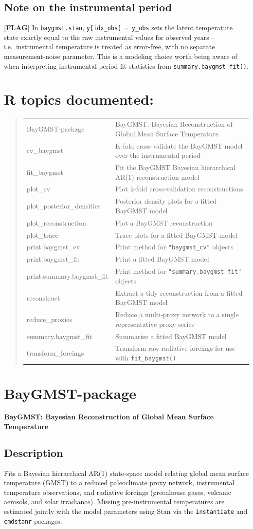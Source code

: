 \documentclass[10pt]{article}
\newcommand{\flag}[1]{\textcolor{gaporange}{\textbf{[FLAG]} #1}}
\newcommand{\rdtopic}[1]{\clearpage\section{#1}}
\newcommand{\rdsub}[1]{\subsection*{#1}}
\begin{document}
\rdsub{Note on the instrumental period}
\flag{In \texttt{baygmst.stan}, \texttt{y[idx\_obs] = y\_obs} sets the
latent temperature state exactly equal to the raw instrumental values for
observed years -- i.e.\ instrumental temperature is treated as error-free,
with no separate measurement-noise parameter. This is a modeling choice
worth being aware of when interpreting instrumental-period fit statistics
from \texttt{summary.baygmst\_fit()}.}

\rdtopic{R topics documented:}
\begin{quote}
\begin{tabular}{ll}
BayGMST-package & BayGMST: Bayesian Reconstruction of Global Mean Surface Temperature \\
cv\_baygmst & K-fold cross-validate the BayGMST model over the instrumental period \\
fit\_baygmst & Fit the BayGMST Bayesian hierarchical AR(1) reconstruction model \\
plot\_cv & Plot k-fold cross-validation reconstructions \\
plot\_posterior\_densities & Posterior density plots for a fitted BayGMST model \\
plot\_reconstruction & Plot a BayGMST reconstruction \\
plot\_trace & Trace plots for a fitted BayGMST model \\
print.baygmst\_cv & Print method for \texttt{"baygmst\_cv"} objects \\
print.baygmst\_fit & Print a fitted BayGMST model \\
print.summary.baygmst\_fit & Print method for \texttt{"summary.baygmst\_fit"} objects \\
reconstruct & Extract a tidy reconstruction from a fitted BayGMST model \\
reduce\_proxies & Reduce a multi-proxy network to a single representative proxy series \\
summary.baygmst\_fit & Summarize a fitted BayGMST model \\
transform\_forcings & Transform raw radiative forcings for use with \texttt{fit\_baygmst()} \\
\end{tabular}
\end{quote}

\rdtopic{BayGMST-package}
\textbf{BayGMST: Bayesian Reconstruction of Global Mean Surface Temperature}

\rdsub{Description}
Fits a Bayesian hierarchical AR(1) state-space model relating global mean
surface temperature (GMST) to a reduced paleoclimate proxy network,
instrumental temperature observations, and radiative forcings (greenhouse
gases, volcanic aerosols, and solar irradiance). Missing pre-instrumental
temperatures are estimated jointly with the model parameters using Stan via
the \texttt{instantiate} and \texttt{cmdstanr} packages.
\end{document}
